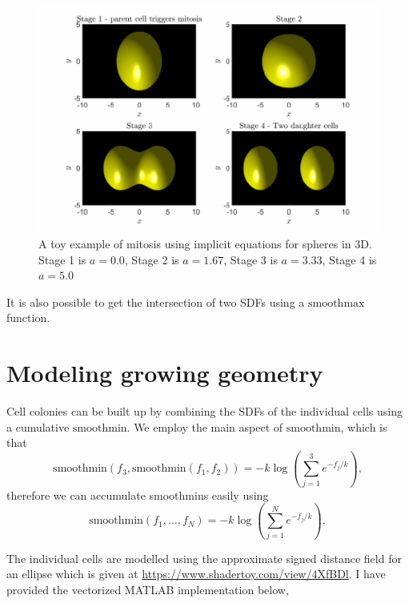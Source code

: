 \begin{figure}[h]
\centering
\includegraphics[width=1\textwidth]{chapter1/figures/CellDivisionDemo.pdf}
\caption{A toy example of mitosis using implicit equations for spheres in 3D. Stage 1 is $a= 0.0$, Stage 2 is $a= 1.67$, Stage 3 is $a=3.33$, Stage 4 is $a = 5.0$}
\label{fig:ToyMitosis}
\end{figure}
\filbreak

It is also possible to get the intersection of two SDFs using a $\textrm{smoothmax}$ function.

\section{Modeling growing geometry }
Cell colonies can be built up by combining the SDFs of the individual cells using a cumulative $\textrm{smoothmin}$. We employ
the main aspect of $\textrm{smoothmin}$, which is that 
\begin{equation}
    \textrm{smoothmin}(f_3, \textrm{smoothmin}(f_1,f_2)) = -k \log( \sum_{j=1}^3 e^{-f_j/k}),
\end{equation}
therefore we can accumulate smoothmins easily using
\begin{equation}
    \textrm{smoothmin}(f_1, \ldots, f_N) = -k \log( \sum_{j=1}^N e^{-f_j/k}),
\end{equation}

The individual cells are modelled using the approximate signed distance field for an ellipse which is given at 
\url{https://www.shadertoy.com/view/4XfBDl}. I have provided the vectorized MATLAB implementation below,

